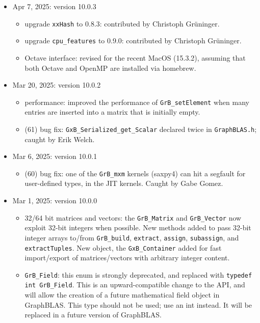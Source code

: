 \begin{itemize}
\item Apr 7, 2025: version 10.0.3

    \begin{itemize}
    \item upgrade \verb'xxHash' to 0.8.3: contributed by Christoph Gr\"uninger.
    \item upgrade \verb'cpu_features' to 0.9.0: contributed by Christoph
        Gr\"uninger.
    \item Octave interface: revised for the recent MacOS (15.3.2), assuming
        that both Octave and OpenMP are installed via homebrew.
    \end{itemize}

\item Mar 20, 2025: version 10.0.2

    \begin{itemize}
    \item performance:  improved the performance of \verb'GrB_setElement'
        when many entries are inserted into a matrix that is initially empty.
    \item (61) bug fix: \verb'GxB_Serialized_get_Scalar' declared twice in
        \verb'GraphBLAS.h'; caught by Erik Welch.
    \end{itemize}

\item Mar 6, 2025: version 10.0.1

    \begin{itemize}
    \item (60) bug fix: one of the \verb'GrB_mxm' kernels (saxpy4) can hit a
    segfault for user-defined types, in the JIT kernels.  Caught by Gabe Gomez.
    \end{itemize}

\item Mar 1, 2025: version 10.0.0

    \begin{itemize}

    \item 32/64 bit matrices and vectors: the \verb'GrB_Matrix' and
        \verb'GrB_Vector' now exploit 32-bit integers when possible.  New
        methods added to pass 32-bit integer arrays to/from \verb'GrB_build',
        \verb'extract', \verb'assign', \verb'subassign', and
        \verb'extractTuples'. New object, the \verb'GxB_Container' added for
        fast import/export of matrices/vectors with arbitrary integer content.

    \item \verb'GrB_Field': this enum is strongly deprecated, and replaced with
        \verb'typedef int GrB_Field'.  This is an upward-compatible change to
        the API, and will allow the creation of a future mathematical field
        object in GraphBLAS.  This type should not be used; use an int instead.
        It will be replaced in a future version of GraphBLAS.


\end{itemize}
\end{itemize}
